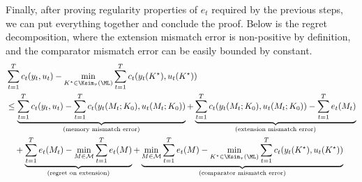 Finally, after proving regularity properties of $e_t$ required by the previous steps, we can put everything together and conclude the proof. Below is the regret decomposition, where the extension mismatch error is non-positive by definition, and the comparator mismatch error can be easily bounded by constant.
\begin{align*}
&\sum_{t=1}^T c_t(y_t,u_t)-\min_{K^{\star}\in \Ksim_\tau(\ML)}\sum_{t=1}^T c_t(y_t(K^{\star}),u_t(K^{\star}))\\
&\le \underbrace{\sum_{t=1}^T c_t(y_t,u_t)-\sum_{t=1}^T c_t(y_t(M_t;K_0),u_t(M_t;K_0))}_{\text{(memory mismatch error)}} + \underbrace{\sum_{t=1}^T c_t(y_t(M_t;K_0),u_t(M_t;K_0))- \sum_{t=1}^Te_t(M_t)}_{\text{(extension mismatch error})} \\
&\quad + \underbrace{\sum_{t=1}^Te_t(M_t)-\min_{M\in\mathcal{M}}\sum_{t=1}^T e_t(M)}_{\text{(regret on extension)}} + \underbrace{\min_{M\in\mathcal{M}}\sum_{t=1}^T e_t(M)- \min_{K^{\star}\in \Ksim_\tau(\ML)}\sum_{t=1}^T c_t(y_t(K^{\star}),u_t(K^{\star}))}_{\text{(comparator mismatch error)}}
\end{align*}

